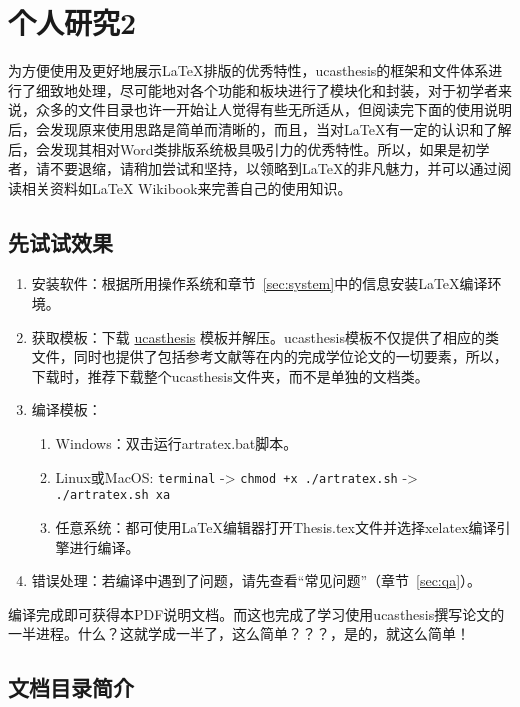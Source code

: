 \chapter{个人研究2}\label{chap:owner2}

为方便使用及更好地展示\LaTeX{}排版的优秀特性，ucasthesis的框架和文件体系进行了细致地处理，尽可能地对各个功能和板块进行了模块化和封装，对于初学者来说，众多的文件目录也许一开始让人觉得有些无所适从，但阅读完下面的使用说明后，会发现原来使用思路是简单而清晰的，而且，当对\LaTeX{}有一定的认识和了解后，会发现其相对Word类排版系统极具吸引力的优秀特性。所以，如果是初学者，请不要退缩，请稍加尝试和坚持，以领略到\LaTeX{}的非凡魅力，并可以通过阅读相关资料如\LaTeX{} Wikibook\citep{wikibook2014latex}来完善自己的使用知识。

\section{先试试效果}

\begin{enumerate}
    \item 安装软件：根据所用操作系统和章节~\ref{sec:system}中的信息安装\LaTeX{}编译环境。
    \item 获取模板：下载 \href{https://github.com/mohuangrui/ucasthesis}{ucasthesis} 模板并解压。ucasthesis模板不仅提供了相应的类文件，同时也提供了包括参考文献等在内的完成学位论文的一切要素，所以，下载时，推荐下载整个ucasthesis文件夹，而不是单独的文档类。
    \item 编译模板：
        \begin{enumerate}
            \item Windows：双击运行artratex.bat脚本。
            \item Linux或MacOS: {\scriptsize \verb|terminal| -> \verb|chmod +x ./artratex.sh| -> \verb|./artratex.sh xa|}
            \item 任意系统：都可使用\LaTeX{}编辑器打开Thesis.tex文件并选择xelatex编译引擎进行编译。
        \end{enumerate}
    \item 错误处理：若编译中遇到了问题，请先查看“常见问题”（章节~\ref{sec:qa}）。
\end{enumerate}

编译完成即可获得本PDF说明文档。而这也完成了学习使用ucasthesis撰写论文的一半进程。什么？这就学成一半了，这么简单？？？，是的，就这么简单！

\section{文档目录简介}

